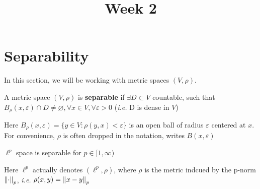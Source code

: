 \documentclass{article}
\title{Week 2}
\author{\aut}
\begin{document}
\maketitle


\section{Separability}  

In this section, we will be working with metric spaces \((V, \rho)\).

\begin{definition}[Separable]
	A metric space $(V,\rho)$ is \textbf{separable} if \(\exists D \subset V\) countable, 
	such that \(B_{\rho}(x, \varepsilon) \cap D \neq \varnothing, \forall x \in V, \forall \varepsilon >0\) 
	(\textit{i.e.} D is dense in \(V\))
\end{definition}

Here \(B_{\rho}(x, \varepsilon)=\{y \in V: \rho (y,x) < \varepsilon\}\) is an open ball of radius \(\varepsilon\) 
centered at \(x\). For convenience, $\rho$ is often dropped in the notation, writes $B(x, \varepsilon)$

\begin{proposition}
	\(\ell^p\) space is separable for \(p \in [1, \infty)\)
\end{proposition}  
Here $\ell^p$ actually denotes  \((\ell^p, \rho)\), where \(\rho\) is the metric indcued by the p-norm \(\left\|{\cdot}\right\|_p\), 
\textit{i.e.} \(\rho(x,y)=\left\|{x-y}\right\|_p\)
\end{document}
